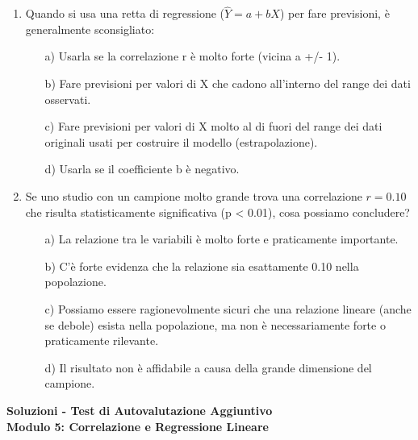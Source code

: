 \documentclass[12pt, a4paper]{article}
\newcommand{\Yhat}{\hat{Y}}
\begin{document}
\begin{enumerate}
\item  Quando si usa una retta di regressione ($\Yhat = a + bX$) per fare previsioni, è generalmente sconsigliato:
\begin{itemize}
    \item[a)] Usarla se la correlazione r è molto forte (vicina a +/- 1).
    \item[b)] Fare previsioni per valori di X che cadono all'interno del range dei dati osservati.
    \item[c)] Fare previsioni per valori di X molto al di fuori del range dei dati originali usati per costruire il modello (estrapolazione).
    \item[d)] Usarla se il coefficiente b è negativo.
\end{itemize}
\vspace{0.3cm}

\item  Se uno studio con un campione molto grande trova una correlazione $r=0.10$ che risulta statisticamente significativa (p < 0.01), cosa possiamo concludere?
\begin{itemize}
    \item[a)] La relazione tra le variabili è molto forte e praticamente importante.
    \item[b)] C'è forte evidenza che la relazione sia esattamente 0.10 nella popolazione.
    \item[c)] Possiamo essere ragionevolmente sicuri che una relazione lineare (anche se debole) esista nella popolazione, ma non è necessariamente forte o praticamente rilevante.
    \item[d)] Il risultato non è affidabile a causa della grande dimensione del campione.
\end{itemize}
\vspace{0.3cm}

    
\end{enumerate}

\newpage

\begin{center}
    \Large\textbf{Soluzioni - Test di Autovalutazione Aggiuntivo} \\
    \vspace{0.2cm}
    \large\textbf{Modulo 5: Correlazione e Regressione Lineare}
\end{center}
\vspace{0.5cm}
\end{document}
